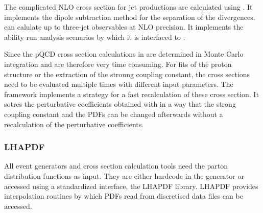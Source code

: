 

The complicated NLO cross section for jet productions are calculated using
\NLOJETPP. It implements the dipole subtraction method for the separation of the
divergences. \NLOJETPP can calulate up to three-jet observables at NLO precision.
It implements the ability run analysis scenarios by which it is interfaced to
\fastNLO.

Since the pQCD cross section calculations in \NLOJETPP are determined in Monte
Carlo integration and are therefore very time consuming. For fits of the proton
structure or the extraction of the stroung coupling constant, the cross sections
need to be evaluated multiple times with different input parameters. The
\fastNLO framework implements a strategy for a fast recalculation of these cross
section. It sotres the perturbative coefficients obtained with \NLOJETPP in a
way that the strong coupling constant and the PDFs can be changed afterwards
without a recalculation of the perturbative coefficients.

\subsubsection{LHAPDF}

All event generators and cross section calculation tools need the parton
distribution functions as input. They are either hardcode in the generator or
accessed using a standardized interface, the LHAPDF library. LHAPDF provides
interpolation routines by which PDFs read from discretised data files can be
accessed. 
